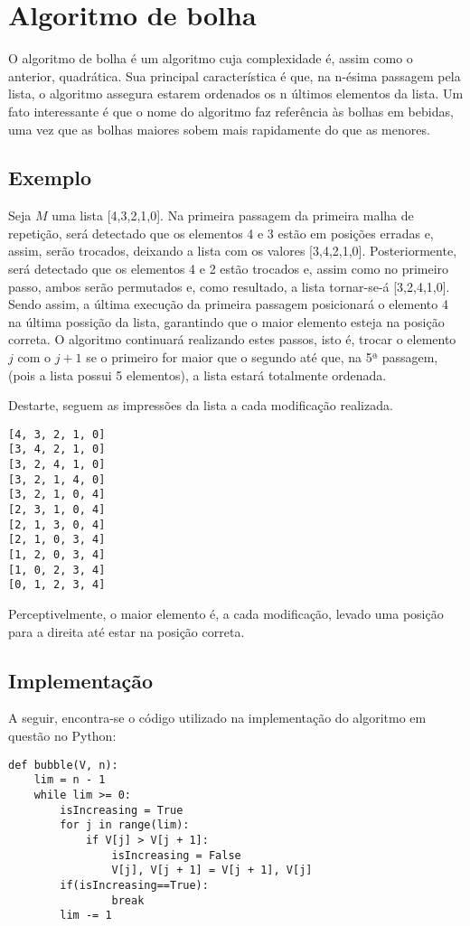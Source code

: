 \section{Algoritmo de bolha}
O algoritmo de bolha é um algoritmo cuja complexidade é, assim como o anterior, quadrática. Sua principal característica é que, na n-ésima passagem pela lista, o algoritmo assegura estarem ordenados os n últimos elementos da lista.
Um fato interessante é que o nome do algoritmo faz referência às bolhas em bebidas, uma vez que as bolhas maiores sobem mais rapidamente do que as menores.


\subsection{Exemplo}
Seja $M$ uma lista [4,3,2,1,0].
Na primeira passagem da primeira malha de repetição, será detectado que os elementos 4 e 3 estão em posições erradas e, assim, serão trocados, deixando a lista com os valores [3,4,2,1,0]. Posteriormente, será detectado que os elementos 4 e 2 estão trocados e, assim como no primeiro passo, ambos serão permutados e, como resultado, a lista tornar-se-á [3,2,4,1,0]. Sendo assim, a última execução da primeira passagem posicionará o elemento 4 na última possição da lista, garantindo que o maior elemento esteja na posição correta.
O algoritmo continuará realizando estes passos, isto é, trocar o elemento $j$ com o $j+1$ se o primeiro for maior que o segundo até que, na 5ª passagem, (pois a lista possui 5 elementos), a lista estará totalmente ordenada.

Destarte, seguem as impressões da lista a cada modificação realizada. 

\begin{lstlisting}
[4, 3, 2, 1, 0]
[3, 4, 2, 1, 0]
[3, 2, 4, 1, 0]
[3, 2, 1, 4, 0]
[3, 2, 1, 0, 4]
[2, 3, 1, 0, 4]
[2, 1, 3, 0, 4]
[2, 1, 0, 3, 4]
[1, 2, 0, 3, 4]
[1, 0, 2, 3, 4]
[0, 1, 2, 3, 4]
\end{lstlisting}

Perceptivelmente, o maior elemento é, a cada modificação, levado uma posição para a direita até estar na posição correta. 
\newpage
\subsection{Implementação}
A seguir, encontra-se o código utilizado na implementação do algoritmo em questão no Python:

\begin{lstlisting}
def bubble(V, n):
    lim = n - 1
    while lim >= 0:
        isIncreasing = True
        for j in range(lim):
            if V[j] > V[j + 1]:
                isIncreasing = False
                V[j], V[j + 1] = V[j + 1], V[j]
        if(isIncreasing==True): 
                break
        lim -= 1
\end{lstlisting}


